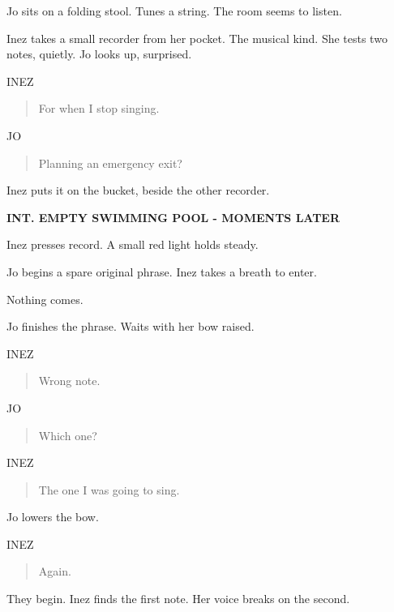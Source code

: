 \documentclass[12pt,letterpaper]{article}
\newcommand{\scene}[1]{\needspace{5\baselineskip}\vspace{8pt}\textbf{#1}\par}
\newcommand{\character}[1]{\needspace{4\baselineskip}\hspace*{2.2in}#1\par\nopagebreak}
\begin{document}
Jo sits on a folding stool. Tunes a string. The room seems to listen.\par

Inez takes a small recorder from her pocket. The musical kind. She tests two notes, quietly. Jo looks up, surprised.\par

\character{INEZ}
\begin{quote}For when I stop singing.\par\end{quote}

\character{JO}
\begin{quote}Planning an emergency exit?\par\end{quote}

Inez puts it on the bucket, beside the other recorder.\par

\scene{INT. EMPTY SWIMMING POOL - MOMENTS LATER}

Inez presses record. A small red light holds steady.\par

Jo begins a spare original phrase. Inez takes a breath to enter.\par

Nothing comes.\par

Jo finishes the phrase. Waits with her bow raised.\par

\character{INEZ}
\begin{quote}Wrong note.\par\end{quote}

\character{JO}
\begin{quote}Which one?\par\end{quote}

\character{INEZ}
\begin{quote}The one I was going to sing.\par\end{quote}

Jo lowers the bow.\par

\character{INEZ}
\begin{quote}Again.\par\end{quote}

They begin. Inez finds the first note. Her voice breaks on the second.\par
\end{document}
